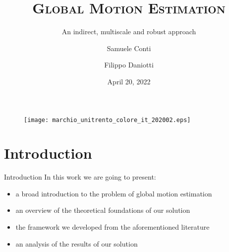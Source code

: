 \documentclass[aspectratio=1610,xcolor=dvipsnames]{beamer}
\author[Conti \and Daniotti]{Samuele Conti \and Filippo Daniotti}
\title[Global Motion Estimation]{\textsc{Global Motion Estimation}}
\subtitle{An indirect, multiscale and robust approach}
\institute[DISI - UniTN]{Department of Information Engineering\\and Computer Science}
\date{April 20, 2022}
\begin{document}
\begin{frame}
    \titlepage
    \begin{figure}[H]
        \begin{center}
            \texttt{[image: marchio\_unitrento\_colore\_it\_202002.eps]}
        \end{center}
    \end{figure}
\end{frame}

\begin{frame}
    \tableofcontents[sectionstyle=show,subsectionstyle=show/shaded/hide,subsubsectionstyle=show/shaded/hide]
\end{frame}

\section{Introduction}
\begin{frame}{Introduction}
    In this work we are going to present:
    \begin{itemize}
        \item a broad introduction to the problem of global motion estimation
        \item an overview of the theoretical foundations of our solution
        \item the framework we developed from the aforementioned literature
        \item an analysis of the results of our solution 
    \end{itemize}
\end{frame}
\end{document}
